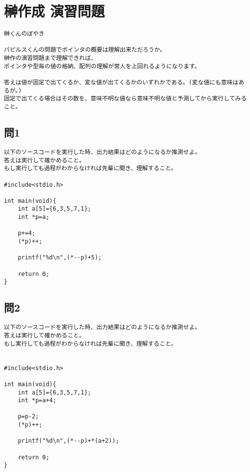 \section{榊作成 演習問題}
\begin{verbatim}
榊くんのぼやき

パピルスくんの問題でポインタの概要は理解出来ただろうか。
榊作の演習問題まで理解できれば、
ポインタや型毎の値の格納、配列の理解が常人を上回れるようになります。

答えは値が固定で出てくるか、変な値が出てくるかのいずれかである。(変な値にも意味はあるが。)
固定で出てくる場合はその数を、意味不明な値なら意味不明な値と予測してから実行してみること。
\end{verbatim}

\subsection{問1}
\begin{verbatim}
以下のソースコードを実行した時、出力結果はどのようになるか推測せよ。
答えは実行して確かめること。
もし実行しても過程がわからなければ先輩に聞き、理解すること。

#include<stdio.h>

int main(void){
	int a[5]={6,3,5,7,1};
	int *p=a;
	
	p+=4;
	(*p)++;
	
	printf("%d\n",(*--p)+5);
	
	return 0;
}
\end{verbatim}

\subsection{問2}
\begin{verbatim}
以下のソースコードを実行した時、出力結果はどのようになるか推測せよ。
答えは実行して確かめること。
もし実行しても過程がわからなければ先輩に聞き、理解すること。


#include<stdio.h>

int main(void){
	int a[5]={6,3,5,7,1};
	int *p=a+4;
	
	p=p-2;
	(*p)++;
	
	printf("%d\n",(*--p)+*(a+2));
	
	return 0;
}
\end{verbatim}

